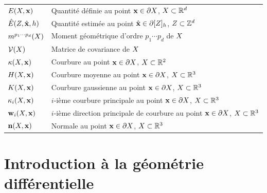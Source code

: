 \begin{table}[ht]
\begin{tabular}{@{}lp{11.5cm}@{}}
    $E(X,\mathbf{x})$                   & Quantité définie au point $\mathbf{x} \in \partial X$, $X \subset \mathbb{R}^d$ \\
    $\hat{E}(Z,\hat{\mathbf{x}},h)$  & Quantité estimée au point $\hat{\mathbf{x}} \in \partial\lbrack Z \rbrack_{h}$, $Z \subset \mathbb{Z}^d$ \\
    $m^{p_1 \cdots p_d}(X)$    & Moment géométrique d'ordre $p_1 \cdots p_d$ de $X$ \\
    $\mathcal{V}(X)$                    & Matrice de covariance de $X$ \\
    $\kappa(X,\mathbf{x})$               & Courbure au point $\mathbf{x} \in \partial X$, $X \subset \mathbb{R}^2$ \\
    $H(X,\mathbf{x})$           & Courbure moyenne au point $\mathbf{x} \in \partial X$, $X \subset \mathbb{R}^3$ \\
    $K(X,\mathbf{x})$          & Courbure gaussienne au point $\mathbf{x} \in \partial X$, $X \subset \mathbb{R}^3$ \\
    $\kappa_{i}(X,\mathbf{x})$       & $i$-ième courbure principale au point $\mathbf{x} \in \partial X$, $X \subset \mathbb{R}^3$ \\
    $\mathbf{w}_{i}(X,\mathbf{x})$        & $i$-ième direction principale de courbure au point $\mathbf{x} \in \partial X$, $X \subset \mathbb{R}^3$ \\
    $\mathbf{n}(X,\mathbf{x})$          & Normale au point $\mathbf{x} \in \partial X$, $X \subset \mathbb{R}^3$ \\
    \bottomrule
  \end{tabular}
\end{table}
%
\section{Introduction à la géométrie différentielle}


